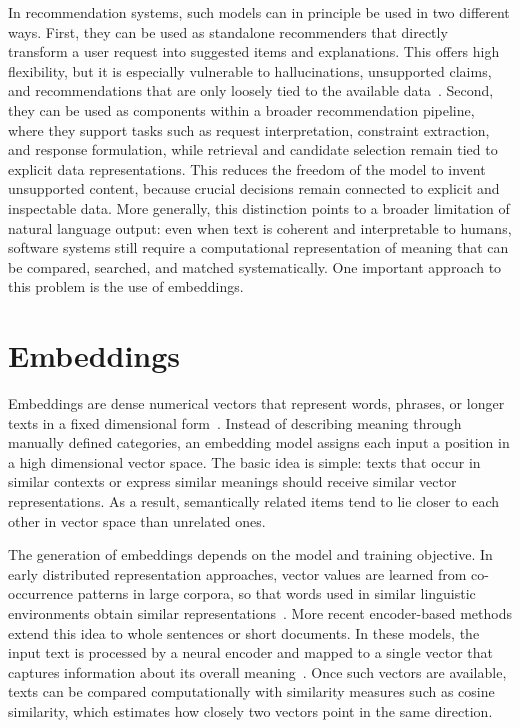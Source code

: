 In recommendation systems, such models can in principle be used in two different ways. First, they can be used as standalone recommenders that directly transform a user request into suggested items and explanations. This offers high flexibility, but it is especially vulnerable to hallucinations, unsupported claims, and recommendations that are only loosely tied to the available data~\parencite{gaoRagSurvey}. Second, they can be used as components within a broader recommendation pipeline, where they support tasks such as request interpretation, constraint extraction, and response formulation, while retrieval and candidate selection remain tied to explicit data representations. This reduces the freedom of the model to invent unsupported content, because crucial decisions remain connected to explicit and inspectable data. More generally, this distinction points to a broader limitation of natural language output: even when text is coherent and interpretable to humans, software systems still require a computational representation of meaning that can be compared, searched, and matched systematically. One important approach to this problem is the use of embeddings.

\section{Embeddings}\label{section:background:embeddings}
Embeddings are dense numerical vectors that represent words, phrases, or longer texts in a fixed dimensional form~\parencite{mikolovDistributedRepresentations}. Instead of describing meaning through manually defined categories, an embedding model assigns each input a position in a high dimensional vector space. The basic idea is simple: texts that occur in similar contexts or express similar meanings should receive similar vector representations. As a result, semantically related items tend to lie closer to each other in vector space than unrelated ones.

The generation of embeddings depends on the model and training objective. In early distributed representation approaches, vector values are learned from co-occurrence patterns in large corpora, so that words used in similar linguistic environments obtain similar representations~\parencite{mikolovDistributedRepresentations}. More recent encoder-based methods extend this idea to whole sentences or short documents. In these models, the input text is processed by a neural encoder and mapped to a single vector that captures information about its overall meaning~\parencite{reimersSentenceBert}. Once such vectors are available, texts can be compared computationally with similarity measures such as cosine similarity, which estimates how closely two vectors point in the same direction.

